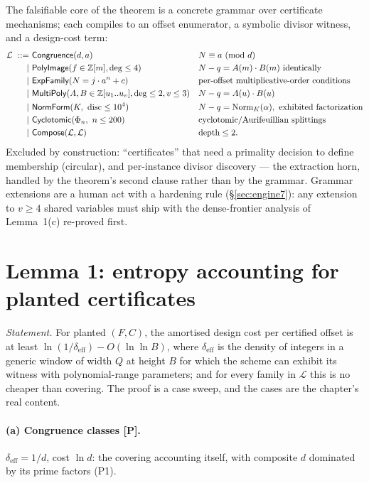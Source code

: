 The falsifiable core of the theorem is a concrete grammar over
certificate mechanisms; each compiles to an offset enumerator, a
symbolic divisor witness, and a design-cost term:
\begin{align*}
\mathcal L\ ::=\ &\textsf{Congruence}(d,a) &&\N\equiv a\ (\mathrm{mod}\ d)\\
\mid\ &\textsf{PolyImage}(f\in\mathbb Z[m],\deg\le4) &&\N-q=A(m)\cdot B(m)\ \text{identically}\\
\mid\ &\textsf{ExpFamily}(\N=j\cdot a^n+c) &&\text{per-offset multiplicative-order conditions}\\
\mid\ &\textsf{MultiPoly}(A,B\in\mathbb Z[u_1..u_v],\deg\le2,v\le3) &&\N-q=A(u)\cdot B(u)\\
\mid\ &\textsf{NormForm}(K,\ \mathrm{disc}\le10^4) &&\N-q=\mathrm{Norm}_K(\alpha),\ \text{exhibited factorization}\\
\mid\ &\textsf{Cyclotomic}(\Phi_n,\ n\le200) &&\text{cyclotomic/Aurifeuillian splittings}\\
\mid\ &\textsf{Compose}(\mathcal L,\mathcal L) &&\text{depth}\le2.
\end{align*}
Excluded by construction: ``certificates'' that need a primality
decision to define membership (circular), and per-instance divisor
discovery --- the extraction horn, handled by the theorem's second
clause rather than by the grammar. Grammar extensions are a human act
with a hardening rule (\S\ref{sec:engine7}): any extension to $v\ge4$
shared variables must ship with the dense-frontier analysis of
Lemma~1(c) re-proved first.

\section{Lemma 1: entropy accounting for planted certificates}\label{sec:lemma1}

\emph{Statement.} For planted $(F,C)$, the amortised design cost per
certified offset is at least $\ln(1/\delta_{\mathrm{eff}})-O(\ln\ln B)$,
where $\delta_{\mathrm{eff}}$ is the density of integers in a generic
window of width $Q$ at height $B$ for which the scheme can exhibit its
witness with polynomial-range parameters; and for every family in
$\mathcal L$ this is no cheaper than covering. The proof is a case
sweep, and the cases are the chapter's real content.

\paragraph{(a) Congruence classes [P].} $\delta_{\mathrm{eff}}=1/d$,
cost $\ln d$: the covering accounting itself, with composite $d$
dominated by its prime factors (P1).

